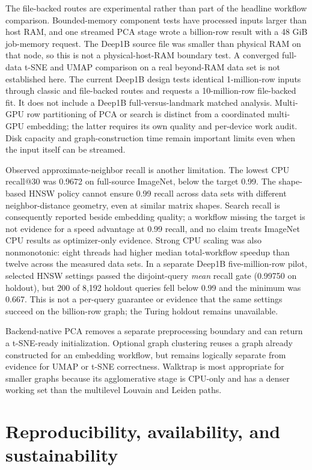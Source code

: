 \documentclass[article]{jss}
\begin{document}
The file-backed routes are experimental rather than part of the headline
workflow comparison. Bounded-memory component tests have processed inputs
larger than host RAM, and one streamed PCA stage wrote a billion-row result
with a 48 GiB job-memory request. The Deep1B source file was smaller than
physical RAM on that node, so this is not a physical-host-RAM boundary test.
A converged full-data t-SNE and UMAP comparison on a real beyond-RAM data
set is not established here. The current Deep1B
design tests identical 1-million-row inputs through classic and file-backed
routes and requests a 10-million-row file-backed fit. It
does not include a Deep1B full-versus-landmark matched analysis. Multi-GPU row
partitioning of PCA or search is distinct from a coordinated multi-GPU
embedding; the latter requires its own quality and per-device work audit.
Disk capacity and graph-construction time remain important limits even
when the input itself can be streamed.

Observed approximate-neighbor recall is another limitation. The lowest
CPU recall@30 was 0.9672 on full-source ImageNet, below the target 0.99.
The shape-based HNSW policy cannot ensure 0.99 recall across data sets with
different neighbor-distance geometry, even at similar matrix shapes.
Search recall is consequently reported beside embedding quality; a workflow
missing the target is not evidence for a speed advantage at 0.99 recall,
and no claim treats ImageNet CPU results as optimizer-only evidence. Strong
CPU scaling was also nonmonotonic: eight threads had higher median
total-workflow speedup than twelve across the measured data sets.
In a separate Deep1B five-million-row pilot, selected HNSW settings passed
the disjoint-query \emph{mean} recall gate (0.99750 on holdout), but 200 of
8,192 holdout queries fell below 0.99 and the minimum was 0.667. This is
not a per-query guarantee or evidence that the same settings succeed on
the billion-row graph; the Turing holdout remains unavailable.

Backend-native PCA removes a separate preprocessing boundary and can return a
t-SNE-ready initialization. Optional graph clustering reuses a graph already
constructed for an embedding workflow, but remains logically separate from
evidence for UMAP or t-SNE correctness. Walktrap is most appropriate for
smaller graphs because its agglomerative stage is CPU-only and has a denser
working set than the multilevel Louvain and Leiden paths.

\section{Reproducibility, availability, and sustainability}
\end{document}
